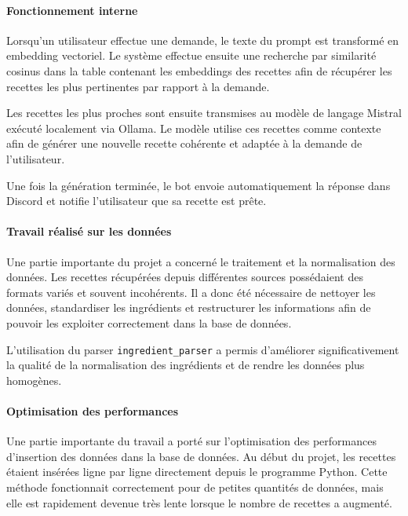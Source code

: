 \documentclass[12pt]{article}
\begin{document}
        \paragraph{Fonctionnement interne}
            Lorsqu’un utilisateur effectue une demande, le texte du prompt est transformé en embedding vectoriel.
            Le système effectue ensuite une recherche par similarité cosinus dans la table contenant les embeddings des recettes afin de récupérer les recettes les plus pertinentes par rapport à la demande.

            Les recettes les plus proches sont ensuite transmises au modèle de langage Mistral exécuté localement via Ollama.
            Le modèle utilise ces recettes comme contexte afin de générer une nouvelle recette cohérente et adaptée à la demande de l’utilisateur.

            Une fois la génération terminée, le bot envoie automatiquement la réponse dans Discord et notifie l’utilisateur que sa recette est prête.

        \paragraph{Travail réalisé sur les données}
            Une partie importante du projet a concerné le traitement et la normalisation des données.
            Les recettes récupérées depuis différentes sources possédaient des formats variés et souvent incohérents.
            Il a donc été nécessaire de nettoyer les données, standardiser les ingrédients et restructurer les informations afin de pouvoir les exploiter correctement dans la base de données.

            L’utilisation du parser \texttt{ingredient\_parser} a permis d’améliorer significativement la qualité de la normalisation des ingrédients et de rendre les données plus homogènes.

        \paragraph{Optimisation des performances}
            Une partie importante du travail a porté sur l’optimisation des performances d’insertion des données dans la base de données.
            Au début du projet, les recettes étaient insérées ligne par ligne directement depuis le programme Python.
            Cette méthode fonctionnait correctement pour de petites quantités de données, mais elle est rapidement devenue très lente lorsque le nombre de recettes a augmenté.
\end{document}
